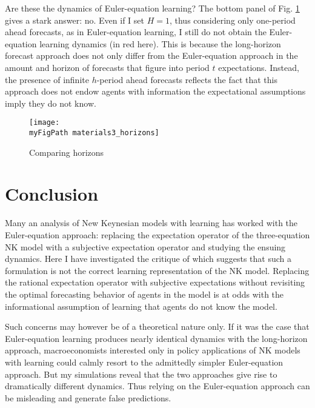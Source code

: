 \documentclass[11pt]{article}
\def \myFigPath {../../figures/}
\renewcommand{\[}{\begin{equation}}
\renewcommand{\]}{\end{equation}}
\def\myBiggerFigScale{0.4}
\begin{document}
Are these the dynamics of Euler-equation learning? The bottom panel of Fig. \ref{horizons} gives a stark answer: no. Even if I set $H=1$, thus considering only one-period ahead forecasts, as in Euler-equation learning, I still do not obtain the Euler-equation learning dynamics (in red here). This is because the long-horizon forecast approach does not only differ from the Euler-equation approach in the amount and horizon of forecasts that figure into period $t$ expectations.  Instead, the presence of infinite $h$-period ahead forecasts reflects the fact that this approach does not endow agents with information the expectational assumptions imply they do not know. 

\begin{figure}[h!]
\texttt{[image: \\myFigPath materials3\_horizons]}
\caption{Comparing horizons}
\label{horizons}
\end{figure}

\clearpage
\section{Conclusion}\label{conclusion}
Many an analysis of New Keynesian models with learning has worked with the Euler-equation approach: replacing the expectation operator of the three-equation NK model with a subjective expectation operator and studying the ensuing dynamics. Here I have investigated the critique of \cite{preston2005} which suggests that such a formulation is not the correct learning representation of the NK model. Replacing the rational expectation operator with subjective expectations without revisiting the optimal forecasting behavior of agents in the model is at odds with the informational assumption of learning that agents do not know the model. 

Such concerns may however be of a theoretical nature only. If it was the case that Euler-equation learning produces nearly identical dynamics with the long-horizon approach, macroeconomists interested only in policy applications of NK models with learning could calmly resort to the admittedly simpler Euler-equation approach. But my simulations reveal that the two approaches give rise to dramatically different dynamics. Thus relying on the Euler-equation approach can be misleading and generate false predictions. 



\nocite{*}
\end{document}
